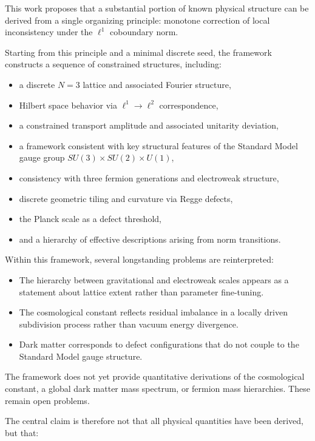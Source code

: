 \documentclass[
]{article}
\providecommand{\tightlist}{%
  \setlength{\itemsep}{0pt}\setlength{\parskip}{0pt}}
\begin{document}
This work proposes that a substantial portion of known physical
structure can be derived from a single organizing principle: monotone
correction of local inconsistency under the \(\ell^1\) coboundary norm.

Starting from this principle and a minimal discrete seed, the framework
constructs a sequence of constrained structures, including:

\begin{itemize}
\tightlist
\item
  a discrete \(N = 3\) lattice and associated Fourier structure,
\item
  Hilbert space behavior via \(\ell^1 \to \ell^2\) correspondence,
\item
  a constrained transport amplitude and associated unitarity deviation,
\item
  a framework consistent with key structural features of the Standard
  Model gauge group \(SU(3) \times SU(2) \times U(1)\),
\item
  consistency with three fermion generations and electroweak structure,
\item
  discrete geometric tiling and curvature via Regge defects,
\item
  the Planck scale as a defect threshold,
\item
  and a hierarchy of effective descriptions arising from norm
  transitions.
\end{itemize}

Within this framework, several longstanding problems are reinterpreted:

\begin{itemize}
\tightlist
\item
  The hierarchy between gravitational and electroweak scales appears as
  a statement about lattice extent rather than parameter fine-tuning.
\item
  The cosmological constant reflects residual imbalance in a locally
  driven subdivision process rather than vacuum energy divergence.
\item
  Dark matter corresponds to defect configurations that do not couple to
  the Standard Model gauge structure.
\end{itemize}

The framework does not yet provide quantitative derivations of the
cosmological constant, a global dark matter mass spectrum, or fermion
mass hierarchies. These remain open problems.

The central claim is therefore not that all physical quantities have
been derived, but that:
\end{document}
